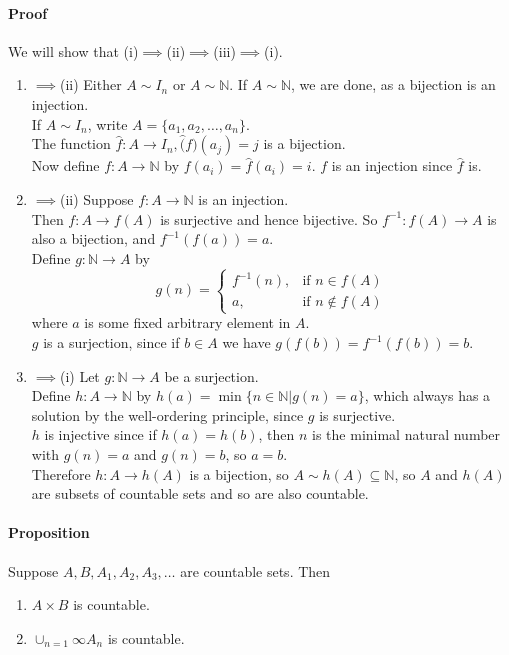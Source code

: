 \documentclass{article}
\newcommand{\mapab}[2]{{#1}\xrightarrow{}{#2}}
\newcommand{\mapAb}[2]{\mathbb{#1}\xrightarrow{}{#2}}
\newcommand{\mapaB}[2]{{#1}\xrightarrow{}\mathbb{#2}}
\begin{document}
	\paragraph{Proof} We will show that (i)$\implies$(ii)$\implies$(iii)$\implies$(i).\newline
	\begin{enumerate}[label=(\roman*)]
		\item $\implies$(ii) Either $A\sim I_n$ or $A\sim\mathbb{N}$. If $A\sim\mathbb{N}$, we are done, as a bijection is an injection.\\
		If $A\sim I_n$, write $A=\{a_1,a_2,\dots,a_n\}.$\\
		The function $\hat{f}:\mapab{A}{I_n}, \hat(f)(a_j)=j$ is a bijection.\\
		Now define $f:\mapaB{A}{N}$ by $f(a_i)=\hat{f}(a_i)=i$. $f$ is an injection since $\hat{f}$ is.\\
		\item $\implies$(ii) Suppose $f:\mapaB{A}{N}$ is an injection.\\
		Then $f:\mapab{A}{f(A)}$ is surjective and hence bijective. So $f^{-1}:\mapab{f(A)}{A}$ is also a bijection, and $f^{-1}(f(a))=a$.\\
		Define $g:\mapAb{N}{A}$ by
		\begin{equation*}
		g(n)=\begin{cases}
			f^{-1}(n), & \textrm{if } n\in f(A)\\
			a, & \textrm{if } n\notin f(A)
		\end{cases}
		\end{equation*}
		where $a$ is some fixed arbitrary element in $A$.\\
		$g$ is a surjection, since if $b\in A$ we have $g(f(b))=f^{-1}(f(b))=b$.\\
		\item $\implies$(i) Let $g:\mapAb{N}{A}$ be a surjection.\\
		Define $h:\mapaB{A}{N}$ by $h(a)=\min\{n\in\mathbb{N}|g(n)=a\}$, which always has a solution by the well-ordering principle, since $g$ is surjective.\\
		$h$ is injective since if $h(a)=h(b)$, then $n$ is the minimal natural number with $g(n) = a$ and $g(n) = b$, so $a=b$.\\
		Therefore $h:\mapab{A}{h(A)}$ is a bijection, so $A\sim h(A)\subseteq\mathbb{N}$, so $A$ and $h(A)$ are subsets of countable sets and so are also countable.
	\end{enumerate}
	\paragraph{Proposition}
	Suppose $A,B,A_1,A_2,A_3,\dots$ are countable sets. Then
	\begin{enumerate}[label=(\roman*)]
		\item $A\times B$ is countable.\\
		\item $\cup_{n=1}{\infty}A_n$ is countable.
	\end{enumerate}
\end{document}
